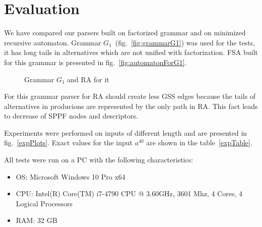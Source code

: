 \documentclass[runningheads,a4paper]{llncs}
\begin{document}
\section{Evaluation}

We have compared our parsers built on factorized grammar and on minimized recursive automaton.
Grammar $G_1$~(fig.~\ref{fig:grammarG1}) was used for the tests, it has long tails in alternatives which are not unified with factorization.
FSA built for this grammar is presented in fig.~\ref{fig:automatonForG1}.

\begin{figure}[ht]   
    \centering

    \caption{Grammar $G_1$ and RA for it}
\end{figure}

For this grammar parser for RA should create less GSS edges because the tails of alternatives in producions
are represented by the only path in RA. This fact leads to decrease of SPPF nodes and descriptors.

Experiments were performed on inputs of different length and are presented in fig.~\ref{expPlots}.
Exact values for the input $a^{40}$ are shown in the table~\ref{expTable}.

All tests were run on a PC with the following characteristics:
\begin{itemize}
    \item OS: Microsoft Windows 10 Pro x64
    \item CPU: Intel(R) Core(TM) i7-4790 CPU @ 3.60GHz, 3601 Mhz, 4 Cores, 4 Logical Processors
    \item RAM: 32 GB
\end{itemize}
\end{document}
